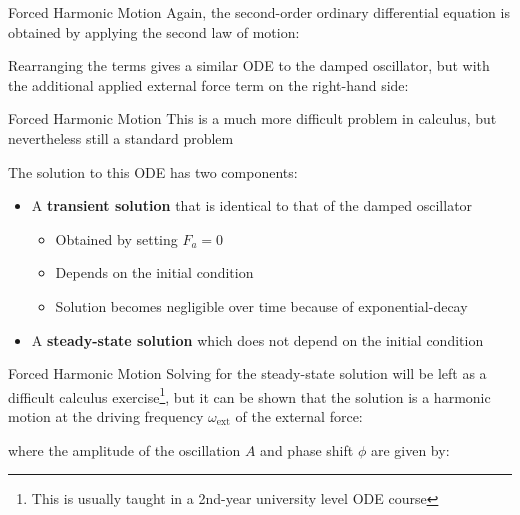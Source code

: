 \documentclass[12pt,compress,aspectratio=169]{beamer}
\begin{document}
\begin{frame}{Forced Harmonic Motion}
  Again, the second-order ordinary differential equation is obtained by
  applying the second law of motion:
  

  Rearranging the terms gives a similar ODE to the damped oscillator, but with
  the {\color{magenta}additional applied external force term} on the right-hand
  side:

\end{frame}



\begin{frame}{Forced Harmonic Motion}
  This is a much more difficult problem in calculus, but nevertheless still a
  standard problem
  
  
  The solution to this ODE has two components:
  \begin{itemize}
  \item A \textbf{transient solution} that is identical to that of the damped
    oscillator
    \begin{itemize}
    \item Obtained by setting $F_a=0$
    \item Depends on the initial condition
    \item Solution becomes negligible over time because of exponential-decay
    \end{itemize}
  \item A \textbf{steady-state solution} which does not depend on the initial
    condition
  \end{itemize}
\end{frame}



\begin{frame}{Forced Harmonic Motion}
  Solving for the steady-state solution will be left as a difficult calculus
  exercise\footnote{This is usually taught in a 2nd-year university level ODE
  course}, but it can be shown that the solution is a harmonic motion at the
  driving frequency $\omega_\text{ext}$ of the external force:

  
  where the amplitude of the oscillation $A$ and phase shift $\phi$ are given
  by:

  \vspace{.5in}
\end{frame}
\end{document}
